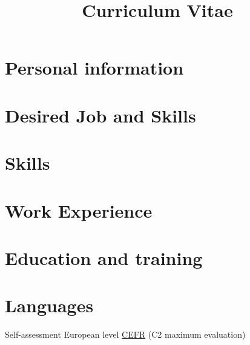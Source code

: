 \documentclass[11pt,a4paper,sans]{moderncv}
\title{Curriculum Vitae}               %
\begin{document}
\maketitle

\section{Personal information}


\section{Desired Job and Skills}
\cvline{}{\Large \myDesideredEmployment}
\cvline{}{\small \mySkillsForJobPosition{\myProfileId} 
}

\section{Skills} 
\mySkills{\myProfileId}
 
\section{Work Experience}
\myExperience{\myProfileId}

\section{Education and training}
\myEducation{\myProfileId}


\section{Languages}

\hspace{25mm}\small Self-assessment European level \href{http://europass.cedefop.europa.eu/en/resources/european-language-levels-cefr}{CEFR} (C2 maximum evaluation)\normalsize
\vspace{5mm}
\end{document}
